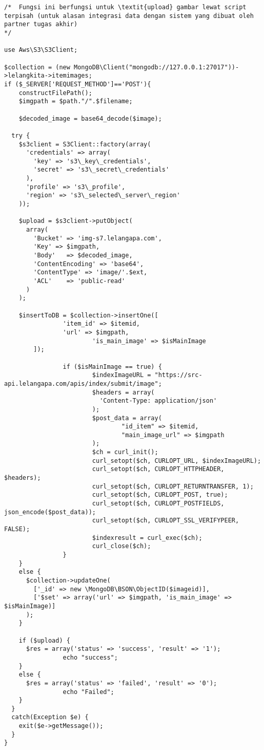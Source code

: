 \begin{lstlisting}[label=cdaws.03-02,style=php,caption=Kode Sumber \textit{Back-end} Upload Gambar Barang]
/*	Fungsi ini berfungsi untuk \textit{upload} gambar lewat script terpisah (untuk alasan integrasi data dengan sistem yang dibuat oleh partner tugas akhir)
*/

use Aws\S3\S3Client;

$collection = (new MongoDB\Client("mongodb://127.0.0.1:27017"))->lelangkita->itemimages;
if ($_SERVER['REQUEST_METHOD']=='POST'){
	constructFilePath();	
	$imgpath = $path."/".$filename;

	$decoded_image = base64_decode($image);

  try {
    $s3client = S3Client::factory(array(
      'credentials' => array(
        'key' => 's3\_key\_credentials',
        'secret' => 's3\_secret\_credentials'
      ),
      'profile' => 's3\_profile',
      'region' => 's3\_selected\_server\_region'
    ));

    $upload = $s3client->putObject(
      array(
        'Bucket' => 'img-s7.lelangapa.com',
        'Key' => $imgpath,
        'Body'   => $decoded_image,
        'ContentEncoding' => 'base64',
        'ContentType' => 'image/'.$ext,
        'ACL'    => 'public-read'
      )
    );

    $insertToDB = $collection->insertOne([
                'item_id' => $itemid,
                'url' => $imgpath,
                        'is_main_image' => $isMainImage
        ]);

                if ($isMainImage == true) {
                        $indexImageURL = "https://src-api.lelangapa.com/apis/index/submit/image";
                        $headers = array(
                          'Content-Type: application/json'
                        );
                        $post_data = array(
                                "id_item" => $itemid,
                                "main_image_url" => $imgpath
                        );
                        $ch = curl_init();
                        curl_setopt($ch, CURLOPT_URL, $indexImageURL);
                        curl_setopt($ch, CURLOPT_HTTPHEADER, $headers);
                        curl_setopt($ch, CURLOPT_RETURNTRANSFER, 1);
                        curl_setopt($ch, CURLOPT_POST, true);
                        curl_setopt($ch, CURLOPT_POSTFIELDS, json_encode($post_data));
                        curl_setopt($ch, CURLOPT_SSL_VERIFYPEER, FALSE);
                        $indexresult = curl_exec($ch);
                        curl_close($ch);
                }
    }
    else {
      $collection->updateOne(
        ['_id' => new \MongoDB\BSON\ObjectID($imageid)],
        ['$set' => array('url' => $imgpath, 'is_main_image' => $isMainImage)]
      );
    }

    if ($upload) {
      $res = array('status' => 'success', 'result' => '1');
                echo "success";
    }
    else {
      $res = array('status' => 'failed', 'result' => '0');
                echo "Failed";
    }
  }
  catch(Exception $e) {
    exit($e->getMessage());
  }
}


\end{lstlisting}
